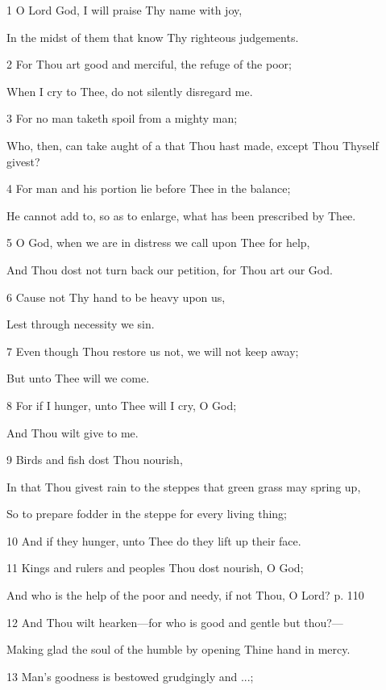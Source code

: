 \par 1 O Lord God, I will praise Thy name with joy,
\par  In the midst of them that know Thy righteous judgements.
\par 2 For Thou art good and merciful, the refuge of the poor;
\par  When I cry to Thee, do not silently disregard me.
\par 3 For no man taketh spoil from a mighty man;
\par  Who, then, can take aught of a that Thou hast made, except Thou Thyself givest?
\par 4 For man and his portion lie before Thee in the balance;
\par  He cannot add to, so as to enlarge, what has been prescribed by Thee.
\par    
\par 5 O God, when we are in distress we call upon Thee for help,
\par  And Thou dost not turn back our petition, for Thou art our God.
\par 6 Cause not Thy hand to be heavy upon us,
\par  Lest through necessity we sin.
\par 7 Even though Thou restore us not, we will not keep away;
\par  But unto Thee will we come.
\par 8 For if I hunger, unto Thee will I cry, O God;
\par  And Thou wilt give to me.
\par    
\par 9 Birds and fish dost Thou nourish,
\par  In that Thou givest rain to the steppes that green grass may spring up,
\par  So to prepare fodder in the steppe for every living thing;
\par 10 And if they hunger, unto Thee do they lift up their face.
\par 11 Kings and rulers and peoples Thou dost nourish, O God;
\par  And who is the help of the poor and needy, if not Thou, O Lord? p. 110
\par 12 And Thou wilt hearken—for who is good and gentle but thou?—
\par  Making glad the soul of the humble by opening Thine hand in mercy.
\par    
\par 13 Man's goodness is bestowed grudgingly and ...;
